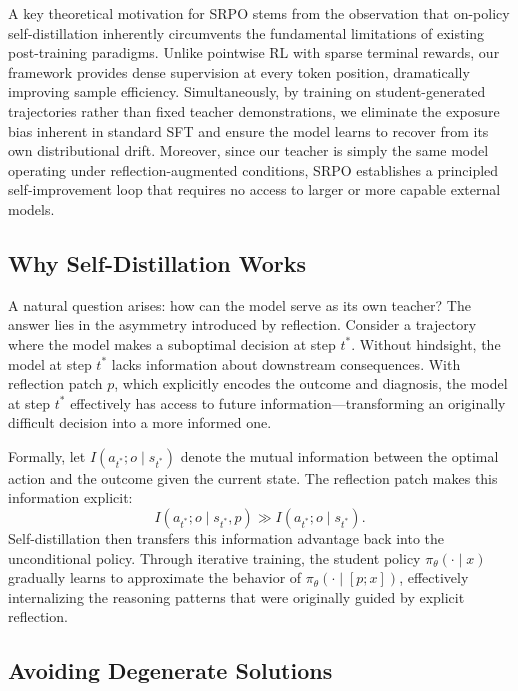 \documentclass{article}
\theoremstyle{plain}
\theoremstyle{definition}
\theoremstyle{remark}
\begin{document}
A key theoretical motivation for SRPO stems from the observation that on-policy self-distillation inherently circumvents the fundamental limitations of existing post-training paradigms.
Unlike pointwise RL with sparse terminal rewards, our framework provides dense supervision at every token position, dramatically improving sample efficiency.
Simultaneously, by training on student-generated trajectories rather than fixed teacher demonstrations, we eliminate the exposure bias inherent in standard SFT and ensure the model learns to recover from its own distributional drift.
Moreover, since our teacher is simply the same model operating under reflection-augmented conditions, SRPO establishes a principled self-improvement loop that requires no access to larger or more capable external models.

\subsection{Why Self-Distillation Works}

A natural question arises: how can the model serve as its own teacher?
The answer lies in the asymmetry introduced by reflection.
Consider a trajectory where the model makes a suboptimal decision at step $t^*$.
Without hindsight, the model at step $t^*$ lacks information about downstream consequences.
With reflection patch $p$, which explicitly encodes the outcome and diagnosis, the model at step $t^*$ effectively has access to future information—transforming an originally difficult decision into a more informed one.

Formally, let $I(a_{t^*}; o \mid s_{t^*})$ denote the mutual information between the optimal action and the outcome given the current state.
The reflection patch makes this information explicit:
\begin{equation}
I(a_{t^*}; o \mid s_{t^*}, p) \gg I(a_{t^*}; o \mid s_{t^*}).
\end{equation}
Self-distillation then transfers this information advantage back into the unconditional policy.
Through iterative training, the student policy $\pi_\theta(\cdot\mid x)$ gradually learns to approximate the behavior of $\pi_\theta(\cdot\mid[p;x])$, effectively internalizing the reasoning patterns that were originally guided by explicit reflection.

\subsection{Avoiding Degenerate Solutions}
\end{document}
